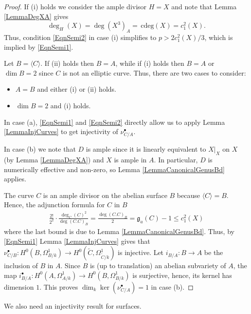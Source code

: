\documentclass[11pt]{amsart}
\theoremstyle{remark}
\numberwithin{equation}{section}
\newcommand{\gfrak}{\mathfrak{g}}
\newcommand{\cdeg}{\,\mathrm{cdeg}}
\begin{document}
\begin{proof} If (i) holds we consider the ample divisor $H=X$ and note that Lemma \ref{LemmaDegXA} gives
$$
\deg_H(X)=\deg(X^3)_A=\cdeg(X)=c_1^2(X).
$$
Thus, condition \eqref{EqnSemi2} in case (i) simplifies to $p>2c_1^2(X)/3$, which is implied by \eqref{EqnSemi1}.


Let $B=\langle C\rangle$. If (ii) holds then $B=A$, while if (i) holds then $B=A$ or $\dim B=2$ since $C$ is not an elliptic curve. Thus, there are two cases to consider: 
\begin{itemize}
\item[(a)] $A=B$ and either (i) or (ii) holds.
\item[(b)] $\dim B=2$ and (i) holds.
\end{itemize}


In case (a),  \eqref{EqnSemi1} and \eqref{EqnSemi2} directly allow us to apply Lemma \ref{LemmaInjCurves} to get injectivity of $\nu_{C/A}^\bullet$.




In case (b) we note that $D$ is ample since it is linearly equivalent to $X|_X$ on $X$ (by Lemma \ref{LemmaDegXA}) and $X$ is ample in $A$. In particular, $D$ is numerically effective and non-zero, so Lemma \ref{LemmaCanonicalGenusBd} applies.


The curve $C$ is an ample divisor on the abelian surface $B$ because $\langle C\rangle =B$. Hence, the adjunction formula for $C$ in $B$
$$
\begin{aligned}
\frac{2!}{2^2}\cdot \frac{\deg_{C}(C)^2}{\deg(C.C)_B}=\frac{\deg(C.C)_B}{2}=\gfrak_a(C)-1\le c_1^2(X)
\end{aligned}
$$
where the last bound is due to Lemma \ref{LemmaCanonicalGenusBd}. Thus, by \eqref{EqnSemi1}  Lemma \ref{LemmaInjCurves} gives that $\nu_{C/B}^\bullet:H^0(B,\Omega^1_{B/k})\to H^0(\widetilde{C},\Omega^1_{\widetilde{C}/k})$ is injective. Let $i_{B/A}:B\to A$ be the inclusion of $B$ in $A$. Since $B$ is (up to translation) an abelian subvariety of $A$, the map $i_{B/A}^\bullet:H^0(A,\Omega^1_{A/k})\to H^0(B,\Omega^1_{B/k})$ is surjective, hence, its kernel has dimension $1$. This proves $\dim_k \ker(\nu_{C/A}^\bullet)=1$ in case (b).
\end{proof}




We also need an injectivity result for surfaces. 
\end{document}
